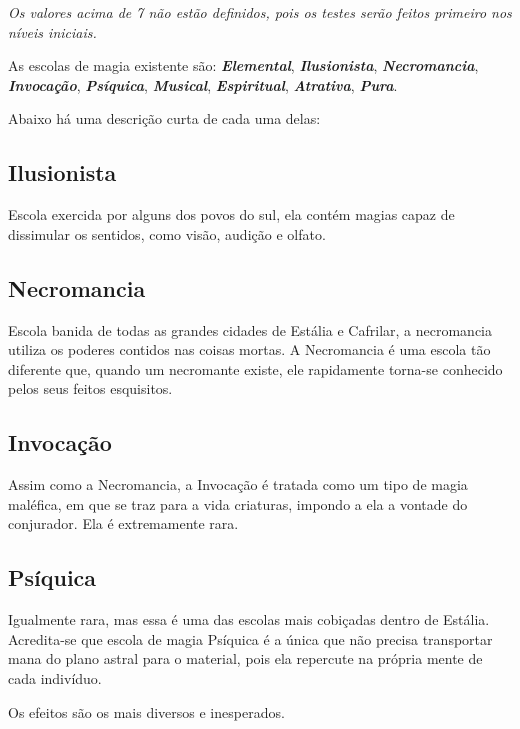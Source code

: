 \documentclass{RPG_Adventure}[2021/10/20]
\begin{document}
\textit{Os valores acima de 7 não estão definidos, pois os testes serão feitos
primeiro nos níveis iniciais.}

As escolas de magia existente são: \textbf{\textit{Elemental}},
\textbf{\textit{Ilusionista}}, \textbf{\textit{Necromancia}},
\textbf{\textit{Invocação}}, \textbf{\textit{Psíquica}},
\textbf{\textit{Musical}}, \textbf{\textit{Espiritual}},
\textbf{\textit{Atrativa}}, \textbf{\textit{Pura}}.

Abaixo há uma descrição curta de cada uma delas:

\subsection*{Ilusionista}%
\label{sub:ilusionista}

Escola exercida por alguns dos povos do sul, ela contém magias capaz de
dissimular os sentidos, como visão, audição e olfato.

\subsection*{Necromancia}%
\label{sub:necromancia}

Escola banida de todas as grandes cidades de Estália e Cafrilar, a necromancia
utiliza os poderes contidos nas coisas mortas. A Necromancia é uma escola tão
diferente que, quando um necromante existe, ele rapidamente torna-se conhecido
pelos seus feitos esquisitos.

\subsection*{Invocação}%
\label{sub:invocacao}

Assim como a Necromancia, a Invocação é tratada como um tipo de magia maléfica,
em que se traz para a vida criaturas, impondo a ela a vontade do conjurador. Ela
é extremamente rara.

\subsection*{Psíquica}%
\label{sub:psiquica}

Igualmente rara, mas essa é uma das escolas mais cobiçadas dentro de Estália.
Acredita-se que escola de magia Psíquica é a única que não precisa transportar
mana do plano astral para o material, pois ela repercute na própria mente de
cada indivíduo.

Os efeitos são os mais diversos e inesperados.
\end{document}
